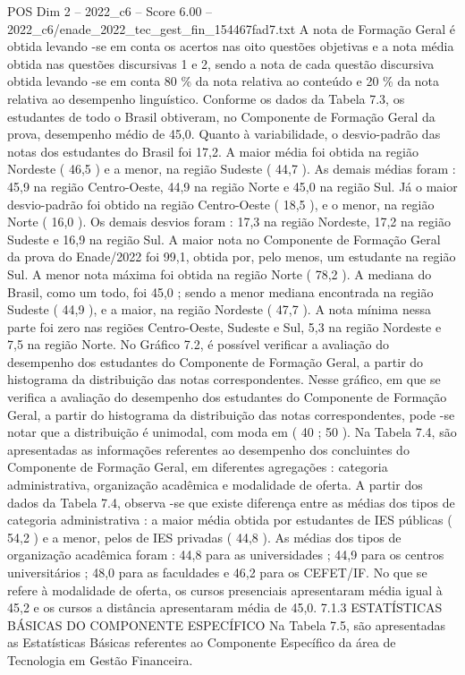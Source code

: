 \begin{textsample}{POS Dim 2 – 2022\_c6 – Score 6.00 – 2022\_c6/enade\_2022\_tec\_gest\_fin\_154467fad7.txt}
A nota de Formação Geral é obtida levando -se em conta os acertos nas oito questões objetivas e a nota média obtida nas questões discursivas 1 e 2, sendo a nota de cada questão discursiva obtida levando -se em conta 80 \% da nota relativa ao conteúdo e 20 \% da nota relativa ao desempenho linguístico.
Conforme os dados da Tabela 7.3, os estudantes de todo o Brasil obtiveram, no Componente de Formação Geral da prova, desempenho médio de 45,0.
Quanto à variabilidade, o desvio-padrão das notas dos estudantes do Brasil foi 17,2.
A maior média foi obtida na região Nordeste ( 46,5 ) e a menor, na região Sudeste ( 44,7 ).
As demais médias foram : 45,9 na região Centro-Oeste, 44,9 na região Norte e 45,0 na região Sul.
Já o maior desvio-padrão foi obtido na região Centro-Oeste ( 18,5 ), e o menor, na região Norte ( 16,0 ).
Os demais desvios foram : 17,3 na região Nordeste, 17,2 na região Sudeste e 16,9 na região Sul.
A maior nota no Componente de Formação Geral da prova do Enade/2022 foi 99,1, obtida por, pelo menos, um estudante na região Sul.
A menor nota máxima foi obtida na região Norte ( 78,2 ).
A mediana do Brasil, como um todo, foi 45,0 ; sendo a menor mediana encontrada na região Sudeste ( 44,9 ), e a maior, na região Nordeste ( 47,7 ).
A nota mínima nessa parte foi zero nas regiões Centro-Oeste, Sudeste e Sul, 5,3 na região Nordeste e 7,5 na região Norte.
No Gráfico 7.2, é possível verificar a avaliação do desempenho dos estudantes do Componente de Formação Geral, a partir do histograma da distribuição das notas correspondentes.
Nesse gráfico, em que se verifica a avaliação do desempenho dos estudantes do Componente de Formação Geral, a partir do histograma da distribuição das notas correspondentes, pode -se notar que a distribuição é unimodal, com moda em ( 40 ; 50 ).
Na Tabela 7.4, são apresentadas as informações referentes ao desempenho dos concluintes do Componente de Formação Geral, em diferentes agregações : categoria administrativa, organização acadêmica e modalidade de oferta.
A partir dos dados da Tabela 7.4, observa -se que existe diferença entre as médias dos tipos de categoria administrativa : a maior média obtida por estudantes de IES públicas ( 54,2 ) e a menor, pelos de IES privadas ( 44,8 ).
As médias dos tipos de organização acadêmica foram : 44,8 para as universidades ; 44,9 para os centros universitários ; 48,0 para as faculdades e 46,2 para os CEFET/IF.
No que se refere à modalidade de oferta, os cursos presenciais apresentaram média igual à 45,2 e os cursos a distância apresentaram média de 45,0. 7.1.3 ESTATÍSTICAS BÁSICAS DO COMPONENTE ESPECÍFICO Na Tabela 7.5, são apresentadas as Estatísticas Básicas referentes ao Componente Específico da área de Tecnologia em Gestão Financeira.

\end{textsample}
